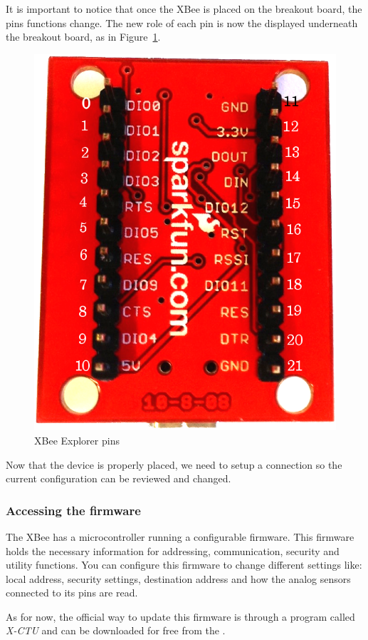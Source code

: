 It is important to notice that once the XBee is placed on the breakout board, the pins functions change. The new role of each pin is now the displayed underneath the breakout board, as in Figure~\ref{fig:xbeeBreakoutBoardPins}.

\begin{figure}[htbp]
  \centering
  \includegraphics[width=0.6\linewidth]{figures/xbeeBreakoutBoardPins.eps}
  \caption{XBee Explorer pins
  \label{fig:xbeeBreakoutBoardPins}}
\end{figure}

Now that the device is properly placed, we need to setup a connection so the current configuration can be reviewed and changed.

\subsubsection{Accessing the firmware}\label{xbeeRoleConfiguration}

The XBee has a microcontroller running a configurable firmware. This firmware holds the necessary information for addressing, communication, security and utility functions. You can configure this firmware to change different settings like: local address, security settings, destination address and how the analog sensors connected to its pins are read.

As for now, the official way to update this firmware is through a program called \emph{X-CTU} and can be downloaded for free from the \emph{}.

